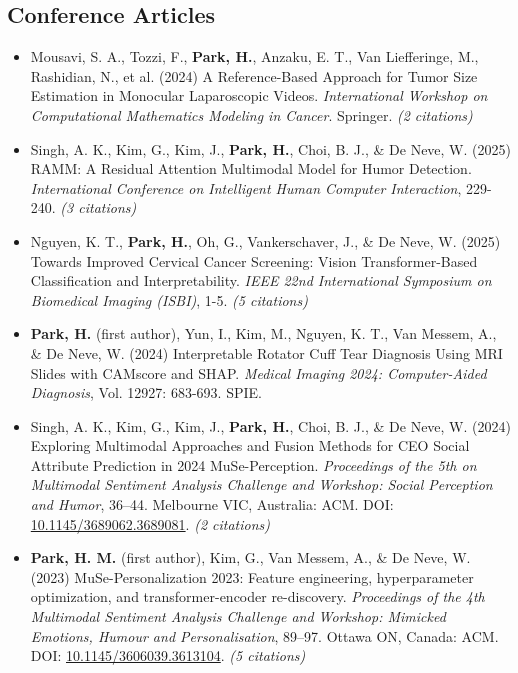 \documentclass[11pt]{article}
\begin{document}
\subsection{Conference Articles}
\begin{itemize}
    \item[\checkmark] Mousavi, S. A., Tozzi, F., \textbf{Park, H.}, Anzaku, E. T., Van Liefferinge, M., Rashidian, N., et al. (2024) A Reference-Based Approach for Tumor Size Estimation in Monocular Laparoscopic Videos. \textit{International Workshop on Computational Mathematics Modeling in Cancer}. Springer. \textit{(2 citations)}
    \item[\checkmark] Singh, A. K., Kim, G., Kim, J., \textbf{Park, H.}, Choi, B. J., \& De Neve, W. (2025) RAMM: A Residual Attention Multimodal Model for Humor Detection. \textit{International Conference on Intelligent Human Computer Interaction}, 229-240. \textit{(3 citations)}
    \item[\checkmark] Nguyen, K. T., \textbf{Park, H.}, Oh, G., Vankerschaver, J., \& De Neve, W. (2025) Towards Improved Cervical Cancer Screening: Vision Transformer-Based Classification and Interpretability. \textit{IEEE 22nd International Symposium on Biomedical Imaging (ISBI)}, 1-5. \textit{(5 citations)}
    \item[\checkmark] \textbf{Park, H.} (first author), Yun, I., Kim, M., Nguyen, K. T., Van Messem, A., \& De Neve, W. (2024) Interpretable Rotator Cuff Tear Diagnosis Using MRI Slides with CAMscore and SHAP. \textit{Medical Imaging 2024: Computer-Aided Diagnosis}, Vol. 12927: 683-693. SPIE.
    \item[\checkmark] Singh, A. K., Kim, G., Kim, J., \textbf{Park, H.}, Choi, B. J., \& De Neve, W. (2024) Exploring Multimodal Approaches and Fusion Methods for CEO Social Attribute Prediction in 2024 MuSe-Perception. \textit{Proceedings of the 5th on Multimodal Sentiment Analysis Challenge and Workshop: Social Perception and Humor}, 36–44. Melbourne VIC, Australia: ACM. DOI: \href{https://doi.org/10.1145/3689062.3689081}{10.1145/3689062.3689081}. \textit{(2 citations)}
    \item[\checkmark] \textbf{Park, H. M.} (first author), Kim, G., Van Messem, A., \& De Neve, W. (2023) MuSe-Personalization 2023: Feature engineering, hyperparameter optimization, and transformer-encoder re-discovery. \textit{Proceedings of the 4th Multimodal Sentiment Analysis Challenge and Workshop: Mimicked Emotions, Humour and Personalisation}, 89–97. Ottawa ON, Canada: ACM. DOI: \href{https://doi.org/10.1145/3606039.3613104}{10.1145/3606039.3613104}. \textit{(5 citations)}

\end{itemize}
\end{document}

